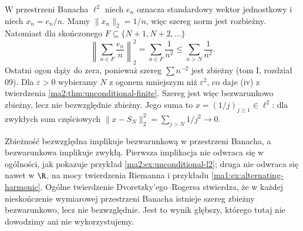 \begin{przyklad}
\label{ma2:ex:unconditional-l2}
W przestrzeni Banacha $\ell^2$ niech $e_n$ oznacza
standardowy wektor jednostkowy i niech $x_n=e_n/n$.
Mamy $\|x_n\|_2=1/n$, więc szereg norm jest rozbieżny.
Natomiast dla skończonego $F\subseteq\{N+1,N+2,\ldots\}$
\[
 \left\|\sum_{n\in F}\frac{e_n}{n}\right\|_2^2
 =\sum_{n\in F}\frac1{n^2}\le\sum_{n>N}\frac1{n^2}.
\]
Ostatni ogon dąży do zera, ponieważ szereg
$\sum n^{-2}$ jest zbieżny (tom I, rozdział 09).
Dla $\varepsilon>0$ wybieramy $N$ z ogonem
mniejszym niż $\varepsilon^2$, co daje (iv)
z twierdzenia \ref{ma2:thm:unconditional-finite}.
Szereg jest więc bezwarunkowo zbieżny, lecz nie
bezwzględnie zbieżny.
Jego suma to $x=(1/j)_{j\ge1}\in\ell^2$:
dla zwykłych sum częściowych
$\|x-S_N\|_2^2=\sum_{j>N}1/j^2\to0$.
\end{przyklad}

\begin{uwaga}
Zbieżność bezwzględna implikuje bezwarunkową w przestrzeni
Banacha, a bezwarunkowa implikuje zwykłą. Pierwsza
implikacja nie odwraca się w ogólności, jak pokazuje
przykład \ref{ma2:ex:unconditional-l2}; druga nie odwraca
się nawet w $\R$, na mocy twierdzenia Riemanna i
przykładu \ref{ma1:ex:alternating-harmonic}.
Ogólne twierdzenie Dvoretzky'ego--Rogersa stwierdza, że
w każdej nieskończenie wymiarowej przestrzeni Banacha
istnieje szereg zbieżny bezwarunkowo, lecz nie bezwzględnie.
Jest to wynik głębszy, którego tutaj nie dowodzimy ani
nie wykorzystujemy.
\end{uwaga}

